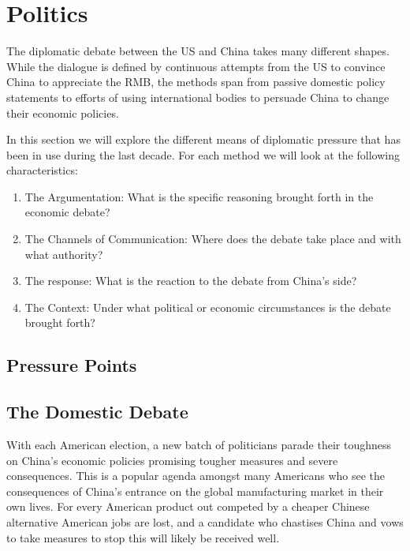 
\section{Politics}

The diplomatic debate between the US and China takes many different 
shapes. While the dialogue is defined by continuous attempts from the US 
to convince China to appreciate the RMB, the methods span from passive 
domestic policy statements to efforts of using international bodies to 
persuade China to change their economic policies.

In this section we will explore the different means of diplomatic 
pressure that has been in use during the last decade. For each method we 
will look at the following characteristics:

\begin{enumerate}
	\item{The Argumentation: What is the specific reasoning brought 
		forth in the economic debate?}
	\item{The Channels of Communication: Where does the debate take 
		place and with what authority?}
	\item{The response: What is the reaction to the debate from China's 
		side?}
	\item{The Context: Under what political or economic circumstances is 
		the debate brought forth?}
\end{enumerate}


\subsection{Pressure Points}


\subsection{The Domestic Debate}
With each American election, a new batch of politicians parade their 
toughness on China's economic policies promising tougher measures and 
severe consequences. This is a popular agenda amongst many Americans who 
see the consequences of China's entrance on the global manufacturing 
market in their own lives. For every American product out competed by a 
cheaper Chinese alternative American jobs are lost, and a candidate who 
chastises China and vows to take measures to stop this will likely be 
received well.

